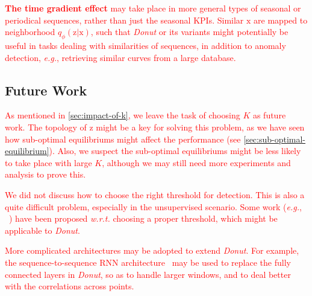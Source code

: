 \documentclass[sigconf]{acmart}
\newcommand\compactdel[1]{{\textcolor{red}{#1}}}
\newcommand\compactdel[1]{}
\newcommand\compactdel[1]{#1}
\newcommand{\DONUT}{\textit{Donut}}
\newcommand{\EG}{\textit{e.g.}}
\newcommand{\WRT}{\textit{w.r.t.}}
\newcommand{\vv}[1]{\bm{\mathrm{{#1}}}}
\begin{document}
\compactdel{
\textbf{The time gradient effect} may take place in more general types of seasonal or periodical sequences, rather than just the seasonal KPIs.
Similar $\vv{x}$ are mapped to neighborhood $q_{\phi}(\vv{z}|\vv{x})$, such that \DONUT{} or its variants might potentially be useful in tasks dealing with similarities of sequences, in addition to anomaly detection, \EG, retrieving similar curves from a large database.
}


\subsection{Future Work}
\label{sec:limitation}
%

\compactdel{As mentioned in \cref{sec:impact-of-k}, we leave the task of choosing $K$ as future work.
The topology of $\vv{z}$ might be a key for solving this problem, as we have seen how sub-optimal equilibriums might affect the performance (see \cref{sec:sub-optimal-equilibrium}).
Also, we suspect the sub-optimal equilibriums might be less likely to take place with large $K$, although we may still need more experiments and analysis to prove this.}

\compactdel{We did not discuss how to choose the right threshold for detection.
This is also a quite difficult problem, especially in the unsupervised scenario.
Some work (\EG, ~\cite{egads}) have been proposed \WRT{} choosing a proper threshold, which might be applicable to \DONUT{}.}

\compactdel{More complicated architectures may be adopted to extend \DONUT{}.
For example, the sequence-to-sequence RNN architecture~\cite{RNN} may be used to replace the fully connected layers in \DONUT{}, so as to handle larger windows, and to deal better with the correlations across points.}

\end{document}
